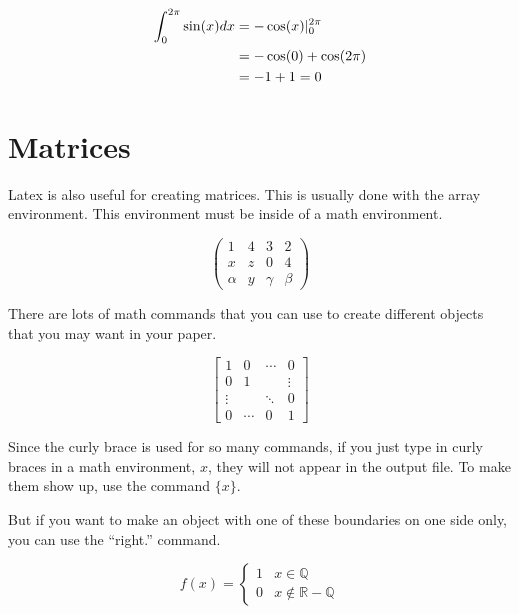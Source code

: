 \documentclass[11pt]{article}
\begin{document}
\begin{align}
\int_0^{2\pi}\sin(x)dx&=-\cos(x)|_0^{2\pi}\\
&=-\cos(0)+\cos(2\pi)\notag\\
&=-1+1=0\notag
\end{align}

\section*{Matrices} %

Latex is also useful for creating matrices.  This is usually done with the array environment.  This environment must be inside of a math environment.

$$\left(\begin{array}{cccc}
1&4&3&2\\
x&z&0&4\\
\alpha&y&\gamma&\beta
\end{array}\right)$$

There are lots of math commands that you can use to create different objects that you may want in your paper.

$$\left[\begin{array}{cccc}
1&0&\cdots&0\\
0&1&&\vdots\\
\vdots&&\ddots&0\\
0&\cdots&0&1
\end{array}\right]$$

Since the curly brace is used for so many commands, if you just type in curly braces in a math environment, ${x}$, they will not appear in the output file.  To make them show up, use the command $\{x\}$.

But if you want to make an object with one of these boundaries on one side only, you can use the ``right.'' command.

$$f(x)=\left\{\begin{array}{cc}
1&x\in\mathbb Q\\%
0&x\notin\mathbb R-\mathbb Q
\end{array}\right.$$
\end{document}
